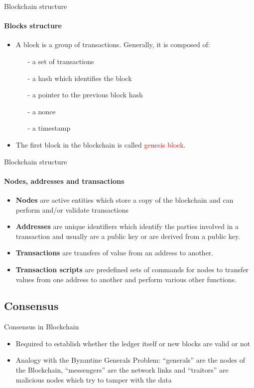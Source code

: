 \documentclass{beamer}
\newcommand\red[1]{\textcolor{red}{#1}}
\begin{document}
  \begin{frame}{Blockchain structure}
    \framesubtitle{Blocks structure}
      \begin{itemize}
        \item  A block is a group of transactions. Generally, it is composed of:
        \begin{itemize}
          \item[-] a set of transactions
          \item[-] a hash which identifies the block
          \item[-] a pointer to the previous block hash
          \item[-] a nonce
          \item[-] a timestamp
        \end{itemize}
        \item The first block in the blockchain is called \red{genesis block}.
      \end{itemize}
  \end{frame}




  \begin{frame}{Blockchain structure}
    \framesubtitle{Nodes, addresses and transactions}
    \begin{itemize}
      \item \textbf{Nodes} are active entities which store a copy of the blockchain and can
      perform and/or validate transactions \pause
      \item \textbf{Addresses} are unique identifiers which identify the parties involved in a
      transaction and usually are a public key or are derived from a public key. \pause
      \item \textbf{Transactions} are transfers of value from an address to another. \pause
      \item \textbf{Transaction scripts} are predefined sets of commands for nodes to transfer
      values from one address to another and perform various other functions.
    \end{itemize}
  \end{frame}



  \subsection{Consensus}
  \begin{frame}{Consensus in Blockchain}
      \begin{itemize}
        \item Required to establish whether the ledger itself or new blocks are
        valid or not
        \item Analogy with the Byzantine Generals Problem: ``generals'' are the nodes of the Blockchain, ``messengers'' are the network links and ``traitors'' are malicious nodes which try to tamper with the data
      \end{itemize}
  \end{frame}
  
\end{document}
